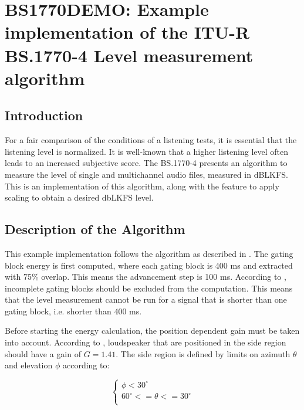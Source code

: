 
\chapter{BS1770DEMO: Example implementation of the ITU-R BS.1770-4 Level measurement algorithm}

\section{Introduction}

For a fair comparison of the conditions of a listening tests, it is essential
that the listening level is normalized. It is well-known that a higher listening
level often leads to an increased subjective score. The BS.1770-4 presents an algorithm
to measure the level of single and multichannel audio files, measured in dBLKFS. 
This is an implementation of this algorithm, along with the feature to apply scaling 
to obtain a desired dbLKFS level.

\section{Description of the Algorithm}

This example implementation follows the algorithm as described in \cite{BS1770}. The gating block
energy is first computed, where each gating block is 400 ms and extracted with 75\% overlap. This
means the advancement step is 100 ms. According to \cite{BS1770}, incomplete gating blocks should
be excluded from the computation. This means that the level measurement cannot be run for a signal
that is shorter than one gating block, i.e. shorter than 400 ms.

Before starting the energy calculation, the position dependent gain must be taken into account. 
According to \cite{BS1770}, loudspeaker that are positioned in the side region should have a gain
of $G=1.41$. The side region is defined by limits on azimuth $\theta$ and elevation $\phi$ according to:

  \[
    \left\{
       \begin{array}{ll}
         \phi < 30 ^{\circ} \\
         60 ^{\circ} <= \theta <= 30 ^{\circ} \\
       \end{array}
     \right.
  \]  


